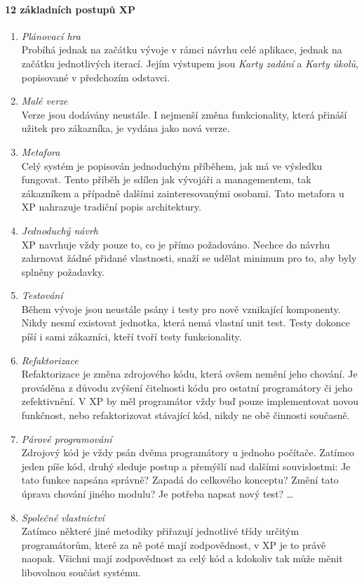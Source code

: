 \paragraph{12 základních postupů XP} \label{methods:XP:12}
\begin{enumerate}
	\item \emph{Plánovací hra}\\Probíhá jednak na začátku vývoje v rámci návrhu celé aplikace, jednak na začátku jednotlivých iterací. Jejím výstupem jsou \emph{Karty zadání} a \emph{Karty úkolů}, popisované v předchozím odstavci.
	\item \emph{Malé verze}\\Verze jsou dodávány neustále. I nejmenší změna funkcionality, která přináší užitek pro zákazníka, je vydána jako nová verze.
	\item \emph{Metafora}\\Celý systém je popisován jednoduchým příběhem, jak má ve výsledku fungovat. Tento příběh je sdílen jak vývojáři a managementem, tak zákazníkem a případně dalšími zainteresovanými osobami. Tato metafora u XP nahrazuje tradiční popis architektury.
	\item \emph{Jednoduchý návrh}\\XP navrhuje vždy pouze to, co je přímo požadováno. Nechce do návrhu zahrnovat žádné přidané vlastnosti, snaží se udělat minimum pro to, aby byly splněny požadavky.
	\item \emph{Testování}\\Během vývoje jsou neustále psány i testy pro nově vznikající komponenty. Nikdy nesmí existovat jednotka, která nemá vlastní unit test. Testy dokonce píší i sami zákazníci, kteří tvoří testy funkcionality.
	\item \emph{Refaktorizace}\\Refaktorizace je změna zdrojového kódu, která ovšem nemění jeho chování. Je prováděna z důvodu zvýšení čitelnosti kódu pro ostatní programátory či jeho zefektivnění. V XP by měl programátor vždy buď pouze implementovat novou funkčnost, nebo refaktorizovat stávající kód, nikdy ne obě činnosti současně.
	\item \emph{Párové programování}\\Zdrojový kód je vždy psán dvěma programátory u jednoho počítače. Zatímco jeden píše kód, druhý sleduje postup a přemýšlí nad dalšími souvislostmi: Je tato funkce napsána správně? Zapadá do celkového konceptu? Změní tato úprava chování jiného modulu? Je potřeba napsat nový test? \ldots
	\item \emph{Společné vlastnictví}\\Zatímco některé jiné metodiky přiřazují jednotlivé třídy určitým programátorům, které za ně poté mají zodpovědnost, v XP je to právě naopak. Všichni mají zodpovědnost za celý kód a kdokoliv tak může měnit libovolnou součást systému.

\end{enumerate}
